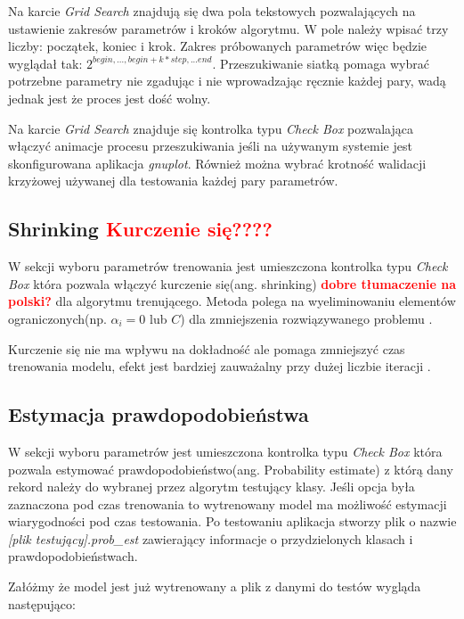 \documentclass[paper=a4, fontsize=11pt]{scrartcl} %
\numberwithin{equation}{section} %
\numberwithin{figure}{section} %
\begin{document}
    \par Na karcie \textit{Grid Search} znajdują się dwa pola tekstowych pozwalających na ustawienie
    zakresów parametrów i kroków algorytmu. W pole należy wpisać trzy liczby: początek, koniec
    i krok. Zakres próbowanych parametrów więc będzie wyglądał tak:
    $2^{begin,...,begin+k*step,...end}$. Przeszukiwanie siatką pomaga wybrać potrzebne
    parametry nie zgadując i nie wprowadzając ręcznie każdej pary, wadą jednak jest że proces
    jest dość wolny. 
    \par Na karcie \textit{Grid Search} znajduje się kontrolka typu \textit{Check Box}
    pozwalająca włączyć animacje procesu przeszukiwania jeśli na używanym systemie jest
    skonfigurowana aplikacja \textit{gnuplot}. Również można wybrać krotność walidacji
    krzyżowej używanej dla testowania każdej pary parametrów. 

\subsection{Shrinking \textbf{\textcolor{red}{Kurczenie się????}}}
    \par W sekcji wyboru parametrów trenowania jest umieszczona kontrolka typu \textit{Check
    Box} która pozwala włączyć kurczenie się(ang. shrinking) \textbf{\textcolor{red}{dobre
    tłumaczenie na polski?}} dla algorytmu trenującego. Metoda polega na wyeliminowaniu
    elementów ograniczonych(np. $\alpha_i = 0$ lub $C$) dla zmniejszenia rozwiązywanego
    problemu \cite{CC01a}. 
    \par Kurczenie się nie ma wpływu na dokładność ale pomaga zmniejszyć czas trenowania
    modelu, efekt jest bardziej zauważalny przy dużej liczbie iteracji \cite{libsvm_faq}.

\subsection{Estymacja prawdopodobieństwa}
    \par W sekcji wyboru parametrów jest umieszczona kontrolka typu \textit{Check Box} która
    pozwala estymować prawdopodobieństwo(ang. Probability estimate) z którą dany rekord należy do
    wybranej przez algorytm testujący klasy. Jeśli opcja była zaznaczona pod czas trenowania to
    wytrenowany model ma możliwość estymacji wiarygodności pod czas testowania. Po testowaniu
    aplikacja stworzy plik o nazwie \textit{[plik testujący].prob\_est} zawierający informacje
    o przydzielonych klasach i prawdopodobieństwach.
    \par Załóżmy że model jest już wytrenowany a plik z danymi do testów wygląda następująco:
\end{document}

